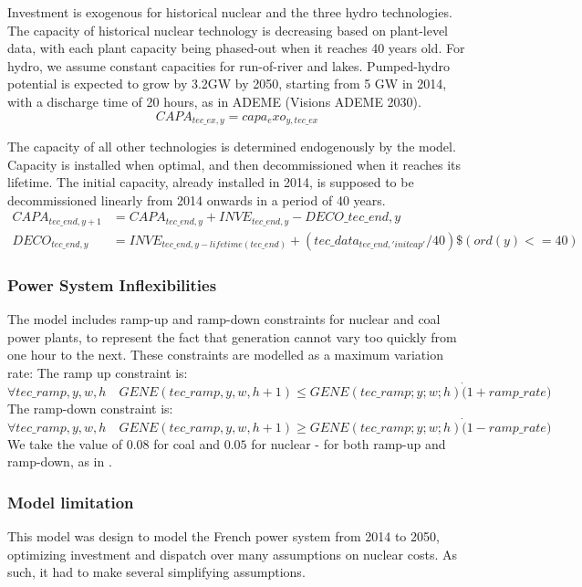 Investment is exogenous for historical nuclear and the three hydro technologies. The capacity of historical nuclear technology is decreasing based on plant-level data, with each plant capacity being phased-out when it reaches 40 years old. For hydro, we assume constant capacities for run-of-river and lakes. Pumped-hydro potential is expected to grow by 3.2GW by 2050, starting from 5 GW in 2014, with a discharge time of 20 hours, as in ADEME (Visions ADEME 2030).
$$CAPA_{tec\_ex,y} = capa_exo_{y,tec\_ex} $$

The capacity of all other technologies is determined endogenously by the model. Capacity is installed when optimal, and then decommissioned when it reaches its lifetime. The initial capacity, already installed in 2014, is supposed to be decommissioned linearly from 2014 onwards in a period of 40 years.
\begin{align*}
CAPA_{tec\_end,y+1} &= CAPA_{tec\_end,y} + INVE_{tec\_end,y} - DECO\_{tec\_end,y} \\
DECO_{tec\_end,y}  &= INVE_{tec\_end,y-lifetime(tec\_end)} + (tec\_data_{tec\_end,'initcap'}/40)\$(ord(y) <= 40) 
\end{align*}



\subsubsection{Power System Inflexibilities}

The model includes ramp-up and ramp-down constraints for nuclear and coal power plants, to represent the fact that generation cannot vary too quickly from one hour to the next. These constraints are modelled as a maximum variation rate:
The ramp up constraint is:
$$\forall tec\_ramp,y,w,h \quad GENE(tec\_ramp,y,w,h+1) \leq GENE(tec\_ramp;y;w;h) \dot (1+ramp\_rate)$$
The ramp-down constraint is:
$$\forall tec\_ramp,y,w,h \quad GENE(tec\_ramp,y,w,h+1) \geq GENE(tec\_ramp;y;w;h) \dot (1-ramp\_rate)$$
We take the value of $0.08$ for coal and $0.05$ for nuclear - for both ramp-up and ramp-down, as in \citet{ADEME2015}.

\subsubsection{Model limitation}

This model was design to model the French power system from 2014 to 2050, optimizing investment and dispatch over many assumptions on nuclear costs. As such, it had to make several simplifying assumptions.

